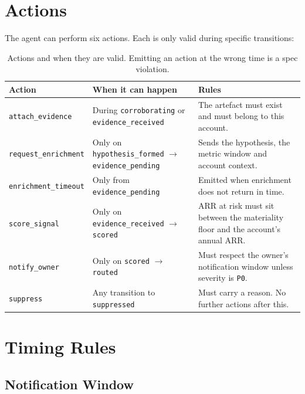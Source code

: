 \documentclass[11pt, a4paper]{article}
\begin{document}
\section{Actions}
\label{sec:actions}

The agent can perform six actions. Each is only valid during specific transitions:

\begin{table}[h]
\centering
\small
\begin{tabular}{lp{4.1cm}p{5.9cm}}
\toprule
\textbf{Action} & \textbf{When it can happen} & \textbf{Rules} \\
\midrule
\texttt{attach\_evidence} & During \texttt{corroborating} or \texttt{evidence\_received} & The artefact must exist and must belong to this account. \\
\texttt{request\_enrichment} & Only on \texttt{hypothesis\_formed} $\rightarrow$ \texttt{evidence\_pending} & Sends the hypothesis, the metric window and account context. \\
\texttt{enrichment\_timeout} & Only from \texttt{evidence\_pending} & Emitted when enrichment does not return in time. \\
\texttt{score\_signal} & Only on \texttt{evidence\_received} $\rightarrow$ \texttt{scored} & ARR at risk must sit between the materiality floor and the account's annual ARR. \\
\texttt{notify\_owner} & Only on \texttt{scored} $\rightarrow$ \texttt{routed} & Must respect the owner's notification window unless severity is \texttt{P0}. \\
\texttt{suppress} & Any transition to \texttt{suppressed} & Must carry a reason. No further actions after this. \\
\bottomrule
\end{tabular}
\caption{Actions and when they are valid. Emitting an action at the wrong time is a spec violation.}
\end{table}

\section{Timing Rules}
\label{sec:timing}

\subsection{Notification Window}
\end{document}
